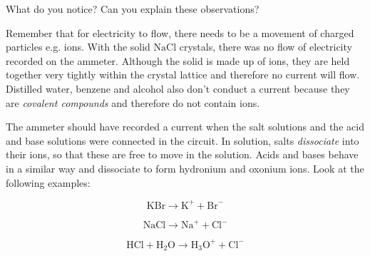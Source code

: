     \par
  \par 
        \label{m38720*id339669}What do you notice? Can you explain these observations?\par 
        \label{m38720*id339672}Remember that for electricity to flow, there needs to be a movement of charged particles e.g. ions. With the solid $\mathrm{NaCl}$ crystals, there was no flow of electricity recorded on the ammeter. Although the solid is made up of ions, they are held together very tightly within the crystal lattice and therefore no current will flow. Distilled water, benzene and alcohol also don't conduct a current because they are \textsl{covalent compounds} and therefore do not contain ions.\par 
        \label{m38720*id339687}The ammeter should have recorded a current when the salt solutions and the acid and base solutions were connected in the circuit. In solution, salts \textsl{dissociate} into their ions, so that these are free to move in the solution. Acids and bases behave in a similar way and dissociate to form hydronium and oxonium ions. Look at the following examples:
        \label{m38720*id339701}\nopagebreak\noindent{}
          
    \begin{equation}
    \mathrm{KBr}\to {\mathrm{K}}^{+}+{\mathrm{Br}}^{-}\tag{17.9}
      \end{equation}
        \label{m38720*id339737}\nopagebreak\noindent{}
          
    \begin{equation}
    \mathrm{NaCl}\to {\mathrm{Na}}^{+}+{\mathrm{Cl}}^{-}\tag{17.10}
      \end{equation}
        \label{m38720*id339770}\nopagebreak\noindent{}
          
    \begin{equation}
    \mathrm{HCl}+{\mathrm{H}}_{2}\mathrm{O}\to {\mathrm{H}}_{3}{\mathrm{O}}^{+}+{\mathrm{Cl}}^{-}\tag{17.11}
      \end{equation}
        \label{m38720*id339831}\nopagebreak\noindent{}
          
